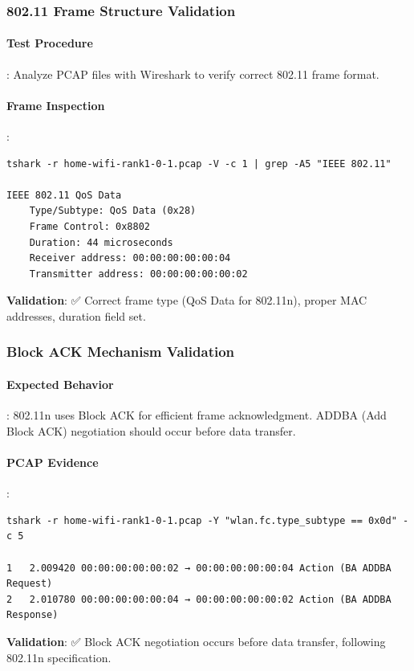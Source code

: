 \subsubsection{802.11 Frame Structure Validation}

\paragraph{Test Procedure}:
Analyze PCAP files with Wireshark to verify correct 802.11 frame format.

\paragraph{Frame Inspection}:
\begin{lstlisting}[style=bash]
tshark -r home-wifi-rank1-0-1.pcap -V -c 1 | grep -A5 "IEEE 802.11"

IEEE 802.11 QoS Data
    Type/Subtype: QoS Data (0x28)
    Frame Control: 0x8802
    Duration: 44 microseconds
    Receiver address: 00:00:00:00:00:04
    Transmitter address: 00:00:00:00:00:02
\end{lstlisting}

\textbf{Validation}: ✅ Correct frame type (QoS Data for 802.11n), proper MAC addresses, duration field set.

\subsubsection{Block ACK Mechanism Validation}

\paragraph{Expected Behavior}:
802.11n uses Block ACK for efficient frame acknowledgment. ADDBA (Add Block ACK) negotiation should occur before data transfer.

\paragraph{PCAP Evidence}:
\begin{lstlisting}[style=bash]
tshark -r home-wifi-rank1-0-1.pcap -Y "wlan.fc.type_subtype == 0x0d" -c 5

1   2.009420 00:00:00:00:00:02 → 00:00:00:00:00:04 Action (BA ADDBA Request)
2   2.010780 00:00:00:00:00:04 → 00:00:00:00:00:02 Action (BA ADDBA Response)
\end{lstlisting}

\textbf{Validation}: ✅ Block ACK negotiation occurs before data transfer, following 802.11n specification.

